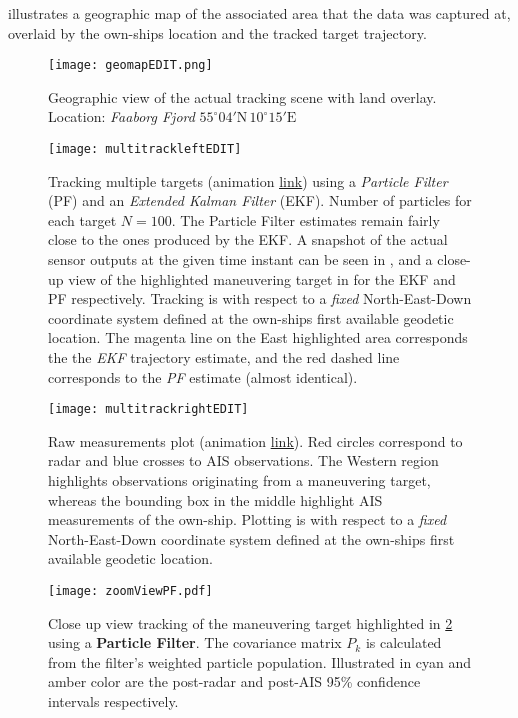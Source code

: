  illustrates a geographic map of the associated area that the data was captured at, overlaid by the own-ships location and the tracked target trajectory.


\begin{figure}[H]
	\centering
	\texttt{[image: geomapEDIT.png]}
	\caption{Geographic view of the actual tracking scene with land overlay. Location: \emph{Faaborg Fjord} $55^\circ 04' \text{N}  \, 10^\circ15' \text{E}$}
	\label{fig:overlay}
\end{figure}


\begin{figure}[H]
	\centering
	\texttt{[image: multitrackleftEDIT]}
	\caption{Tracking multiple targets (animation \href{https://dimidagd.github.io/thesis/3dView_real_dataEKFandPF.gif}{\underline{link}}) using a \emph{Particle Filter} (PF) and an \emph{Extended Kalman Filter} (EKF). Number of particles for each target $N=100$. The Particle Filter estimates remain fairly close to the ones produced by the EKF. A snapshot of the actual sensor outputs at the given time instant can be seen in , and a close-up view of the highlighted maneuvering target in  for the EKF and PF respectively. Tracking is with respect to a \emph{fixed} North-East-Down coordinate system defined at the own-ships first available geodetic location. The magenta line on the East highlighted area corresponds the the \emph{EKF} trajectory estimate, and the red dashed line corresponds to the \emph{PF} estimate (almost identical).}
	\label{fig:EKFandPF}
\end{figure}

\begin{figure}[H]
	\centering
	\texttt{[image: multitrackrightEDIT]}
	\caption{Raw measurements plot (animation \href{https://dimidagd.github.io/thesis/tracking_to_referenceEKFandPF.gif}{\underline{link}}). Red circles correspond to radar and blue crosses to AIS observations. The Western region highlights observations originating from a maneuvering target, whereas the bounding box in the middle highlight AIS measurements of the own-ship.  Plotting is with respect to a \emph{fixed} North-East-Down coordinate system defined at the own-ships first available geodetic location.}
	\label{fig:EKFandPFraw}
\end{figure}


\begin{figure}[H]
	\centering
	\texttt{[image: zoomViewPF.pdf]}
	\caption{Close up view tracking of the maneuvering target highlighted in \cref{fig:EKFandPF} using a \textbf{Particle Filter}. The covariance matrix $P_k$ is calculated from the filter's weighted particle population. Illustrated in cyan and amber color are the post-radar and post-AIS 95\% confidence intervals respectively. }
	\label{fig:zoomviewpf}
\end{figure}


